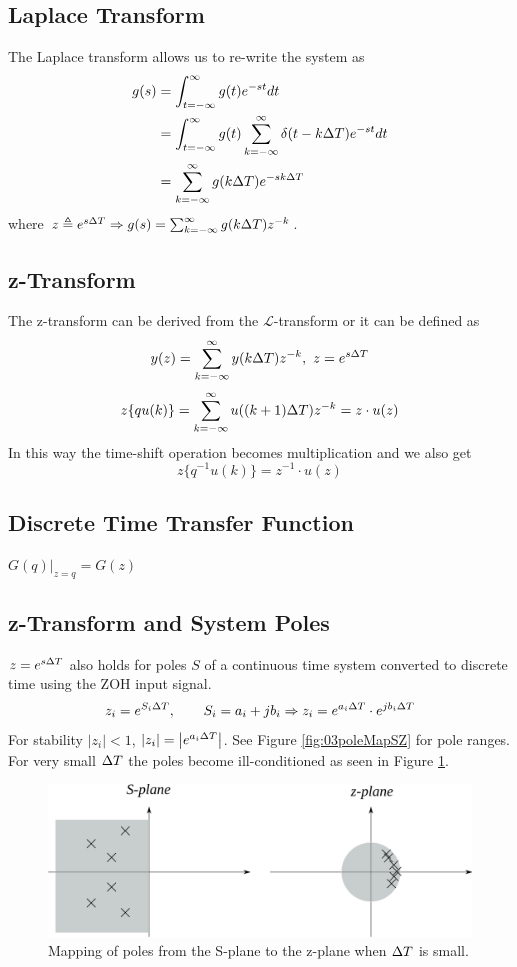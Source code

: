 \subsection{Laplace Transform}
The Laplace transform allows us to re-write the system as
\begin{align*}
g(s) &= \int_{t=-\infty}^\infty g(t)e^{-st}dt \\
&= \int_{t=-\infty}^\infty g(t)\sum_{k=-\infty}^\infty \delta(t-k\Delta T)e^{-st}dt \\
&= \sum_{k=-\infty}^\infty g(k\Delta T)e^{-sk\Delta T}
\end{align*}
where $z\triangleq e^{s\Delta T} \Rightarrow g(s) = \sum_{k=-\infty}^\infty g(k\Delta T)z^{-k}$.

\subsection{z-Transform}
The z-transform can be derived from the $\mathcal{L}$-transform or it can be defined as
$$y(z) = \sum_{k=-\infty}^\infty y(k\Delta T)z^{-k}, ~z=e^{s\Delta T}$$
$$z\lbrace qu(k)\rbrace = \sum_{k=-\infty}^\infty u((k+1)\Delta T)z^{-k} = z\cdot u(z)$$
In this way the time-shift operation becomes multiplication and we also get
$$z\lbrace q^{-1}u(k)\rbrace = z^{-1}\cdot u(z)$$

\subsection{Discrete Time Transfer Function}
$G(q)|_{z=q} = G(z)$

\subsection{z-Transform and System Poles}
$z=e^{s\Delta T}$ also holds for poles $S$ of a continuous time system converted to discrete time using the ZOH input signal.
$$z_i=e^{S_i\Delta T}, \qquad S_i = a_i+jb_i \Rightarrow z_i = e^{a_i\Delta T} \cdot e^{jb_i\Delta T}$$
For stability $|z_i|<1$, $|z_i|=\left| e^{a_i\Delta T}\right|$. See Figure \ref{fig:03poleMapSZ} for pole ranges. For very small $\Delta T$ the poles become ill-conditioned as seen in Figure \ref{fig:03poleMapSZsmallT}.
\begin{figure}[ht!]
	\centering
	\includegraphics[width=.6\textwidth]{images/03poleMapSZsmallT}
	\caption{Mapping of poles from the S-plane to the z-plane when $\Delta T$ is small.}
	\label{fig:03poleMapSZsmallT}
\end{figure}

